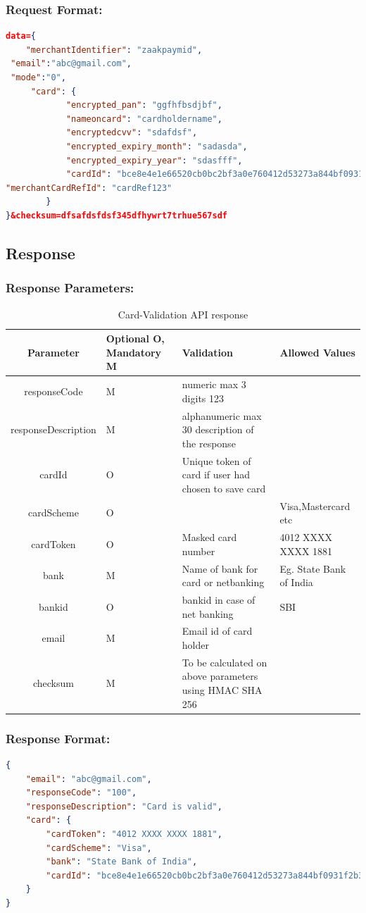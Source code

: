 \documentclass{article}
\begin{document}
\subsubsection{Request Format:}
 \begin{lstlisting}[language=json,breaklines=true]
data={ 
    "merchantIdentifier": "zaakpaymid", 
 "email":"abc@gmail.com", 
 "mode":"0", 
     "card": { 
            "encrypted_pan": "ggfhfbsdjbf", 
            "nameoncard": "cardholdername", 
            "encryptedcvv": "sdafdsf", 
            "encrypted_expiry_month": "sadasda", 
            "encrypted_expiry_year": "sdasfff", 
            "cardId": "bce8e4e1e66520cb0bc2bf3a0e760412d53273a844bf0931f2b3136a2ee0ada3~1", 
"merchantCardRefId": "cardRef123" 
        } 
}&checksum=dfsafdsfdsf345dfhywrt7trhue567sdf
 \end{lstlisting}
 \subsection{Response}
 \subsubsection{Response Parameters:}
 \begin{longtable}{||c|| p{2.09cm}|| p{5.5cm}| p{4.7cm}||}
\caption{Card-Validation API response}\\
\rowcolor{green!50}
\bfseries{Parameter} & \bfseries{Optional O, Mandatory M} & \bfseries{Validation} & \bfseries{Allowed Values} \\ \hline
responseCode  & M & numeric max 3 digits 123 &  \\
responseDescription  & M & alphanumeric max 30 description of the response & \\
cardId  & O & Unique token of card if user had chosen to save card  & \\
cardScheme  & O  &  & Visa,Mastercard etc \\
cardToken  & O & Masked card number & 4012 XXXX XXXX 1881\\
bank  & M  & Name of bank for card or netbanking & Eg. State Bank of India\\
bankid  & O  & bankid in case of net banking & SBI\\
email  & M  & Email id of card holder  & \\
checksum & M & To be calculated on above parameters using HMAC SHA 256 & \\
\end{longtable}
\newpage
\subsubsection{Response Format:}
 \begin{lstlisting}[language=json,breaklines=true]
{ 
    "email": "abc@gmail.com", 
    "responseCode": "100", 
    "responseDescription": "Card is valid", 
    "card": { 
        "cardToken": "4012 XXXX XXXX 1881", 
        "cardScheme": "Visa", 
        "bank": "State Bank of India", 
        "cardId": "bce8e4e1e66520cb0bc2bf3a0e760412d53273a844bf0931f2b3136a2ee0ada3~1" "merchantCardRefId": "cardRef123" 
    } 
} 
 \end{lstlisting}
\newpage
\end{document}
